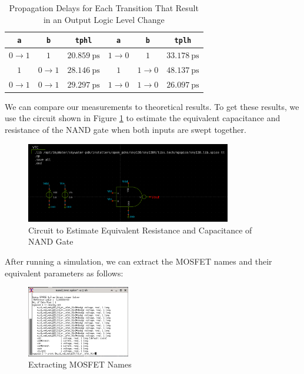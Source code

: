 \documentclass[fleqn]{article}
\begin{document}
	\begin{table}[H]
	\begin{center}
	\caption{Propagation Delays for Each Transition That Result in an Output Logic Level Change}
	\label{table::nand_gate_delay_analysis}
	\begin{tabular}{| c | c | c || c | c | c |}
		\hline
		\texttt{a} & \texttt{b} & \texttt{tphl} & \texttt{a} & \texttt{b} & \texttt{tplh} \\
		\hline	
		$0 \rightarrow 1$ & $1$ & $20.859\ \text{ps}$ & $1 \rightarrow 0$ & $1$ & $33.178\ \text{ps}$\\
		\hline	
		$1$ & $0 \rightarrow 1$ & $28.146\ \text{ps}$ & $1$ & $1 \rightarrow 0$ & $48.137\ \text{ps}$\\
		\hline	
		$0 \rightarrow 1$ & $0 \rightarrow 1$ & $29.297\ \text{ps}$ & $1 \rightarrow 0$ & $1 \rightarrow 0$ & $26.097\ \text{ps}$\\
		\hline
	\end{tabular}
	\end{center}
	\end{table}
	
	We can compare our measurements to theoretical results. To get these results, we use the circuit shown in Figure \ref{fig::nand_eq_test_sweep_va_vb} to estimate the equivalent capacitance and resistance of the NAND gate when both inputs are swept together.
	
	\begin{figure}[H]
		\centerline{\includegraphics[width=0.8\textwidth]{nand_eq_test_sweep_va_vb.png}}
		\caption{Circuit to Estimate Equivalent Resistance and Capacitance of NAND Gate}
		\label{fig::nand_eq_test_sweep_va_vb}
	\end{figure}
	
	\noindent After running a simulation, we can extract the MOSFET names and their equivalent parameters as follows:
	
	\begin{figure}[H]
		\centerline{\includegraphics[width=0.4\textwidth]{nand_eq_display_sweep_va_vb.png}}
		\caption{Extracting MOSFET Names}
		\label{fig::nand_eq_display_sweep_va_vb}
	\end{figure}
	
\end{document}
